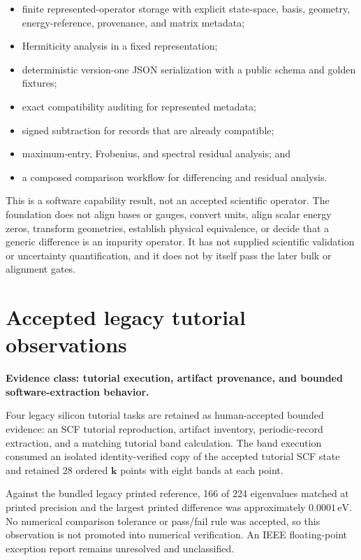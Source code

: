 \begin{itemize}
  \item finite represented-operator storage with explicit state-space, basis,
    geometry, energy-reference, provenance, and matrix metadata;
  \item Hermiticity analysis in a fixed representation;
  \item deterministic version-one JSON serialization with a public schema and
    golden fixtures;
  \item exact compatibility auditing for represented metadata;
  \item signed subtraction for records that are already compatible;
  \item maximum-entry, Frobenius, and spectral residual analysis; and
  \item a composed comparison workflow for differencing and residual analysis.
\end{itemize}

This is a software capability result, not an accepted scientific operator. The
foundation does not align bases or gauges, convert units, align scalar energy
zeros, transform geometries, establish physical equivalence, or decide that a
generic difference is an impurity operator. It has not supplied scientific
validation or uncertainty quantification, and it does not by itself pass the
later bulk or alignment gates.

\section{Accepted legacy tutorial observations}

\textbf{Evidence class: tutorial execution, artifact provenance, and bounded
software-extraction behavior.}

Four legacy silicon tutorial tasks are retained as human-accepted bounded
evidence: an SCF tutorial reproduction, artifact inventory, periodic-record
extraction, and a matching tutorial band calculation. The band execution
consumed an isolated identity-verified copy of the accepted tutorial SCF state
and retained 28 ordered $\mathbf k$ points with eight bands at each point.

Against the bundled legacy printed reference, 166 of 224 eigenvalues matched at
printed precision and the largest printed difference was approximately
$0.0001\,\mathrm{eV}$. No numerical comparison tolerance or pass/fail rule was
accepted, so this observation is not promoted into numerical verification. An
IEEE floating-point exception report remains unresolved and unclassified.

